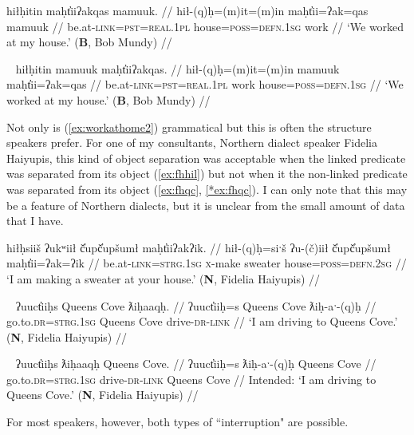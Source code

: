 \ex \label{ex:workathome}
\begingl
\glpreamble hiłḥitin maḥt̓iiʔakqas mamuuk. //
\gla hił-(q)ḥ=(m)it=(m)in maḥt̓ii=ʔak=qas mamuuk //
\glb be.at-\textsc{link}=\textsc{pst}=\textsc{real.1pl} house=\textsc{poss}=\textsc{defn.1sg} work //
\glft `We worked at my house.' (\textbf{B}, Bob Mundy) //
\endgl
\xe

\ex~ \label{ex:workathome2}
\begingl
\glpreamble hiłḥitin mamuuk maḥt̓iiʔakqas. //
\gla hił-(q)ḥ=(m)it=(m)in mamuuk maḥt̓ii=ʔak=qas //
\glb be.at-\textsc{link}=\textsc{pst}=\textsc{real.1pl} work house=\textsc{poss}=\textsc{defn.1sg} //
\glft `We worked at my house.' (\textbf{B}, Bob Mundy) //
\endgl
\xe

Not only is (\ref{ex:workathome2}) grammatical but this is often the structure speakers prefer. For one of my consultants, Northern dialect speaker Fidelia Haiyupis, this kind of object separation was acceptable when the linked predicate was separated from its object (\ref{ex:fhhil}) but not when it the non-linked predicate was separated from its object (\ref{ex:fhqc}, \ref{*ex:fhqc}). I can only note that this may be a feature of Northern dialects, but it is unclear from the small amount of data that I have. %

\ex \label{ex:fhhil}
\begingl
\glpreamble hiłḥsiiš ʔukʷiił č̓upč̓upšumł maḥt̓iiʔakʔik. //
\gla hił-(q)ḥ=siˑš ʔu-(č)iił č̓upč̓upšumł maḥt̓ii=ʔak=ʔik //
\glb be.at-\textsc{link}=\textsc{strg.1sg} \textsc{x}-make sweater house=\textsc{poss}=\textsc{defn.2sg} //
\glft `I am making a sweater at your house.' (\textbf{N}, Fidelia Haiyupis) //
\endgl
\xe

\ex~ \label{ex:fhqc}
\begingl
\glpreamble ʔuuct̓iiḥs Queens Cove ƛiḥaaqḥ. //
\gla ʔuuct̓iiḥ=s Queens Cove ƛiḥ-aˑ-(q)ḥ //
\glb go.to.\textsc{dr}=\textsc{strg.1sg} Queens Cove drive-\textsc{dr}-\textsc{link} //
\glft `I am driving to Queens Cove.' (\textbf{N}, Fidelia Haiyupis) //
\endgl
\xe

\ex~ \label{*ex:fhqc}
\begingl
\glpreamble *ʔuuct̓iiḥs ƛiḥaaqḥ Queens Cove. //
\gla ʔuuct̓iiḥ=s ƛiḥ-aˑ-(q)ḥ Queens Cove //
\glb go.to.\textsc{dr}=\textsc{strg.1sg} drive-\textsc{dr}-\textsc{link} Queens Cove //
\glft Intended: `I am driving to Queens Cove.' (\textbf{N}, Fidelia Haiyupis) //
\endgl
\xe

\noindent For most speakers, however, both types of ``interruption" are possible.

